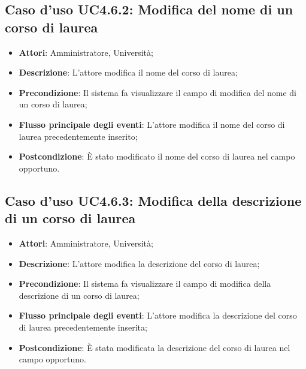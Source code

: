 \subsection{Caso d'uso \texorpdfstring{UC4.6.2}{UC4.6.2}: Modifica del nome di un corso di laurea}
\begin{itemize}
\item \textbf{Attori}: Amministratore, Università;
\item \textbf{Descrizione}: L'attore modifica il nome del corso di laurea;

\item \textbf{Precondizione}: Il sistema fa visualizzare il campo di modifica del nome di un corso di laurea;

\item \textbf{Flusso principale degli eventi}: L'attore modifica il nome del corso di laurea precedentemente inserito;

\item \textbf{Postcondizione}: È stato modificato il nome del corso di laurea nel campo opportuno.


\end{itemize}
\subsection{Caso d'uso \texorpdfstring{UC4.6.3}{UC4.6.3}: Modifica della descrizione di un corso di laurea}
\begin{itemize}
\item \textbf{Attori}: Amministratore, Università;
\item \textbf{Descrizione}: L'attore modifica la descrizione del corso di laurea;

\item \textbf{Precondizione}: Il sistema fa visualizzare il campo di modifica della descrizione di un corso di laurea;

\item \textbf{Flusso principale degli eventi}: L'attore modifica la descrizione del corso di laurea precedentemente inserita;

\item \textbf{Postcondizione}: È stata modificata la descrizione del corso di laurea nel campo opportuno.

\end{itemize}

